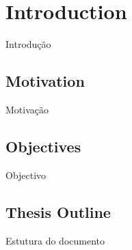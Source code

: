 
\chapter{Introduction}
\label{chapter:introduction}

Introdução

\section{Motivation}
\label{section:motivation}

Motivação

\section{Objectives}
\label{section:objectives}

Objectivo   


\section{Thesis Outline}
\label{section:outline}

Estutura do documento
